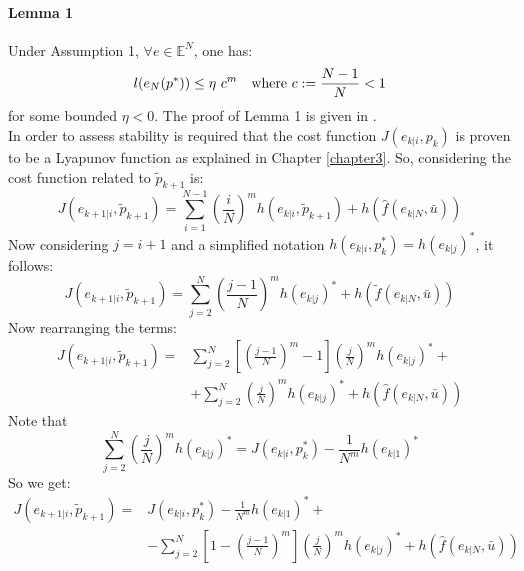 \paragraph{Lemma 1} Under Assumption 1, $\forall e \in \mathbb{E}^N$, one has:
\begin{equation}
	l(e_N(p^*)) \leq \eta\ c^m\ \ \  \textnormal{where    } c:=\frac{N-1}{N} < 1
 	\label{lemma1}
\end{equation}
for some bounded $\eta < 0$. The proof of Lemma 1 is given in \cite{alamir2018stability}. \\

In order to assess stability is required that the cost function $J({e}_{k|i},{p}_k)$ is proven to be a Lyapunov function as explained in Chapter \ref{chapter3}. So, considering the cost function related to $\tilde{p}_{k+1}$ is:
\begin{equation*}
    J({e}_{k+1|i},\tilde{p}_{k+1})=\sum_{i=1}^{N-1}\left(\frac{i}{N}\right)^m h({e}_{k|i},\tilde{p}_{k+1})+h(\hat{f}(e_{k|N},\bar{u}))
\end{equation*}
Now considering $j=i+1$ and a simplified notation $h({e}_{k|i},p_{k}^*)=h(e_{k|j})^*$, it follows: 
\begin{equation*}
    J({e}_{k+1|i},\tilde{p}_{k+1})=\sum_{j=2}^{N}\left(\frac{j-1}{N}\right)^m h(e_{k|j})^*+h(\tilde{f}(e_{k|N},\bar{u}))
\end{equation*}
Now rearranging the terms: 
\begin{equation*}
    \begin{split}
        J({e}_{k+1|i},\tilde{p}_{k+1})=&\sum_{j=2}^{N}\left[\left(\frac{j-1}{N}\right)^m-1\right]\left(\frac{j}{N}\right)^m h(e_{k|j})^*+ \\
        &+\sum_{j=2}^{N}\left(\frac{j}{N}\right)^m h(e_{k|j})^* + h(\hat{f}(e_{k|N},\bar{u}))
    \end{split}
\end{equation*}
Note that 
\begin{equation*}
	\sum_{j=2}^{N}\left(\frac{j}{N}\right)^m h(e_{k|j})^*=J({e}_{k|i},p_{k}^*)-\frac{1}{N^m}h(e_{k|1})^*
\end{equation*}
So we get:
\begin{equation*}
    \begin{split}
        J({e}_{k+1|i},\tilde{p}_{k+1})=&J({e}_{k|i},p_{k}^*)-\frac{1}{N^m}h(e_{k|1})^*+ \\ 
        &-\sum_{j=2}^{N}\left[1-\left(\frac{j-1}{N}\right)^m\right]\left(\frac{j}{N}\right)^m h(e_{k|j})^*+ h(\hat{f}(e_{k|N},\bar{u}))
    \end{split}
\end{equation*}
